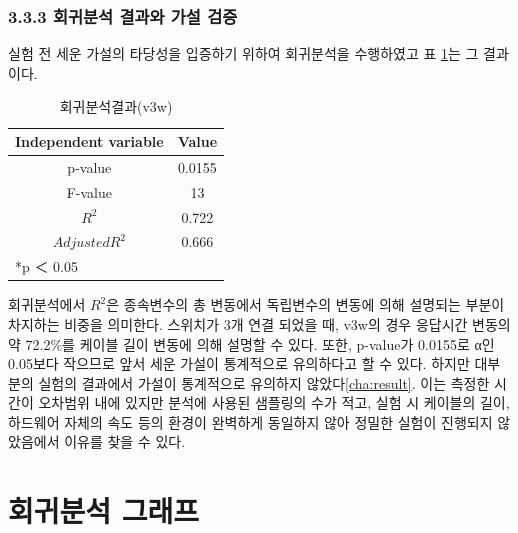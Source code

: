 \documentclass[11pt
  , a4paper
  , article
  , oneside
]{memoir}
\begin{document}
 \subsection{3.3.3 회귀분석 결과와 가설 검증}
 실험 전 세운 가설의 타당성을 입증하기 위하여 회귀분석을 수행하였고 표 \ref{table:regression}는 그 결과이다.
 
\begin{table}[!htb]
\begin{center}
\begin{tabular}{c|c}\hline
Independent variable & Value  \\ \hline\hline
p-value &  0.0155\\ 
F-value &  13\\ 
$  R^2  $ &  0.722\\ 
$ Adjusted R^2 $ & 0.666 \\ \hline
\multicolumn{2}{l}{*p ＜ 0.05} \\ \hline\hline
\end{tabular}
\caption{회귀분석결과(v3w)}
  \label{table:regression}  
\end{center}
\end{table} 
회귀분석에서 $  R^2  $은 종속변수의 총 변동에서 독립변수의 변동에 의해 설명되는 부분이 차지하는 비중을 의미한다. 스위치가 3개 연결 되었을 때, v3w의 경우 응답시간 변동의 약 72.2\%를 케이블 길이 변동에 의해 설명할 수 있다. 또한, p-value가 0.0155로 α인 0.05보다 작으므로 앞서 세운 가설이 통계적으로 유의하다고 할 수 있다. 하지만 대부분의 실험의 결과에서 가설이 통계적으로 유의하지 않았다\ref{cha:result}. 이는 측정한 시간이 오차범위 내에 있지만 분석에 사용된 샘플링의 수가 적고, 실험 시 케이블의 길이, 하드웨어 자체의 속도 등의 환경이 완벽하게 동일하지 않아 정밀한 실험이 진행되지 않았음에서 이유를 찾을 수 있다. 

\clearpage
\appendix
\addappheadtotoc
\renewcommand*\printchaptername{\Large\bfseries\appendixname~}
\chapter{회귀분석 그래프}
\end{document}
